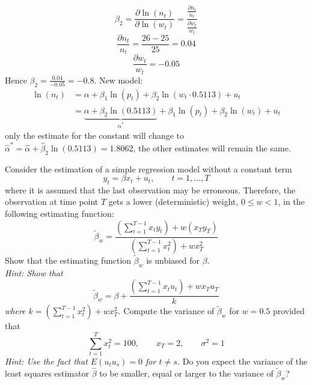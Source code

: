 \documentclass{article}
\begin{document}
\begin{Answer}
\Question
$$\beta_2 = \frac{\partial \ln(n_t)}{\partial \ln(w_t)} = \frac{\frac{\partial n_t}{n_t}}{\frac{\partial w_t}{w_t}}$$
$$\frac{\partial n_t}{n_t} = \frac{26-25}{25}=0.04$$
$$\frac{\partial w_t}{w_t} = -0.05$$
Hence $\beta_2 = \frac{0.04}{-0.05}=-0.8$.
\Question
New model:
\begin{align*}
\ln(n_t) &= \alpha + \beta_1 \ln(p_t) + \beta_2 \ln(w_t \cdot 0.5113) + u_t\\
&=\underbrace{\alpha + \beta_2\ln(0.5113)}_{\alpha^*} + \beta_1 \ln(p_t) + \beta_2 \ln(w_t) + u_t
\end{align*}
only the estimate for the constant will change to $\hat{\alpha}^* = \hat{\alpha}+\hat{\beta}_2\ln(0.5113)=1.8062$, the other estimates will remain the same.
\end{Answer}


\newpage
\begin{Exercise}[title=(Estimating Functions)]
Consider the estimation of a simple regression model without a constant term
$$y_t = \beta x_t + u_t, \qquad t=1,...,T$$
where it is assumed that the last observation may be erroneous. Therefore, the observation at time point $T$ gets a lower (deterministic) weight, $0 \leq w <1$, in the following estimating function:
$$\tilde{\beta}_w = \frac{\left(\sum_{t=1}^{T-1}x_t y_t\right)+w (x_T y_T)}{\left(\sum_{t=1}^{T-1}x_t^2\right)+w x_T^2}$$
\Question Show that the estimating function $\tilde{\beta}_w$ is unbiased for $\beta$.\\
\textit{	Hint: Show that
	$$\tilde{\beta}_w = \beta + \frac{(\sum_{t=1}^{T-1}x_t u_t)+w x_T u_T}{k}$$ where $k=(\sum_{t=1}^{T-1}x_t^2)+w x_T^2$.} 
\Question Compute the variance of $\tilde{\beta}_w$ for $w=0.5$ provided that
	$$ \sum_{t=1}^{T} x_t^2 = 100,\qquad x_T = 2,\qquad \sigma^2 = 1$$
	\textit{Hint: Use the fact that $E(u_t u_s)=0$ for $t\neq s$.}
\Question Do you expect the variance of the least squares estimator  $\hat{\beta}$ to be smaller, equal or larger to the variance of $\tilde{\beta}_w$?
\end{Exercise}
\end{document}
